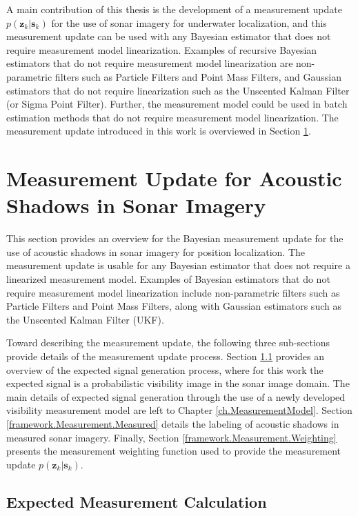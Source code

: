 A main contribution of this thesis is the development of a measurement update $p(\mathbf{z}_k | \mathbf{s}_k)$  for the use of sonar imagery for underwater localization, and this measurement update can be used with any Bayesian estimator that does not require measurement model linearization.
Examples of recursive Bayesian estimators that do not require measurement model linearization are non-parametric filters such as Particle Filters and Point Mass Filters, and Gaussian estimators that do not require linearization such as the Unscented Kalman Filter (or Sigma Point Filter).
Further, the measurement model could be used in batch estimation methods that do not require measurement model linearization.
The measurement update introduced in this work is overviewed in Section \ref{framework.Measurement}.

\section{Measurement Update for Acoustic Shadows in Sonar Imagery}
\label{framework.Measurement}

This section provides an overview for the Bayesian measurement update for the use of acoustic shadows in sonar imagery for position localization.
The measurement update is usable for any Bayesian estimator that does not require a linearized measurement model. 
Examples of Bayesian estimators that do not require measurement model linearization include non-parametric filters such as Particle Filters and Point Mass Filters, along with Gaussian estimators such as the Unscented Kalman Filter (UKF).

Toward describing the measurement update, the following three sub-sections provide details of the measurement update process.
Section \ref{framework.Measurement.Expected} provides an overview of the expected signal generation process, where for this work the expected signal is a probabilistic visibility image in the sonar image domain.
The main details of expected signal generation through the use of a newly developed visibility measurement model are left to Chapter \ref{ch.MeasurementModel}.
Section \ref{framework.Measurement.Measured} details the labeling of acoustic shadows in measured sonar imagery.
Finally, Section \ref{framework.Measurement.Weighting} presents the measurement weighting function used to provide the measurement update $p(\mathbf{z}_k | \mathbf{s}_k)$.

\subsection{Expected Measurement Calculation}
\label{framework.Measurement.Expected}


